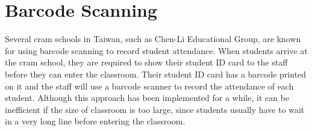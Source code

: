 \section{Barcode Scanning}
Several cram schools in Taiwan, such as Chen-Li Educational Group, are known for
using barcode scanning to record student attendance. When students arrive at the
cram school, they are required to show their student ID card to the staff before
they can enter the classroom. Their student ID card has a barcode printed on it
and the staff will use a barcode scanner to record the attendance of each student.
Although this approach has been implemented for a while, it can be inefficient
if the size of classroom is too large, since students usually have to wait
in a very long line before entering the classroom.
